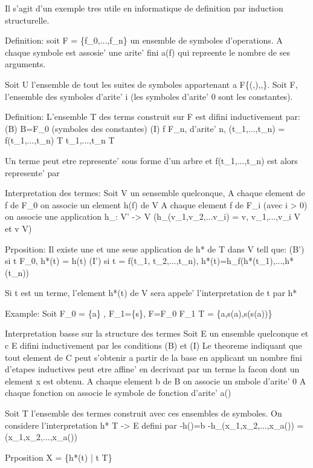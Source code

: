 \documentclass{article}
\begin{document}
Il s'agit d'un exemple tres utile en informatique de definition par induction structurelle.

Definition:
soit F = \{f_0,...,f_n\} un ensemble de symboles d'operations. A chaque symbole est assosie' une arite' fini a(f) \in \N qui repreente le nombre de ses arguments.

Soit U l'ensemble de tout les suites de symboles appartenant a F\cup \{(,),,\}.
Soit F, l'ensemble des symboles d'arite' i (les symboles d'arite' 0 sont les constantes).

Definition: L'ensemble T des terms construit sur F est difini inductivement par:
(B) B=F_0 (symboles des constantes)
(I) \forall f \in F_n, d'arite' n, \phi(t_1,...,t_n) = f(t_1,...,t_n) \in T
    \forall t_1,...,t_n \in T

Un terme peut etre represente' sous forme d'un arbre et f(t_1,...,t_n) est alors represente' par


Interpretation des termes:
Soit V  un sensemble quelconque, A chaque element de f de F_0 on associe un element h(f) de V
A chaque element f de F_i (avec i > 0) on associe une application h_\phi : V' -> V
(h_\phi(v_1,v_2,...v_i) = v, v_1,...,v_i \in V et v \in V)

Prposition: Il existe une et une seue application de h* de T dans V tell que:
(B') si t \in F_0, h*(t) = h(t)
(I') si t = f(t_1, t_2,...,t_n), h*(t)=h_f(h*(t_1),...,h*(t_n))

Si t est un terme, l'element h*(t) de V sera appele' l'interpretation de t par h*

Example: Soit F_0 = \{a\} , F_1=\{s\}, F=F_0 \cup F_1
T = \{a,s(a),s(s(a))\}

Interpretation basse sur la structure des termes
Soit E un ensemble quelconque et c \subseteq E difini inductivement par les conditions (B) et (I)
Le theoreme indiquant que tout element de C peut s'obtenir a partir de la base en applicant un nombre fini d'etapes inductives peut etre affine' en decrivant par un terme la facon dont un element x est obtenu.
A chaque element b de B on associe un smbole  d'arite' 0
A chaque fonction \phi on associe le symbole de fonction \overline{\phi} d'arite' a(\phi)

Soit T l'ensemble des termes construit avec ces ensembles de symboles. On considere l'interpretation h* T -> E defini par
-h()=b
-h_\phi (x_1,x_2,...,x_{a(\phi)}) = \phi(x_1,x_2,...,x_{a(\phi)})

Prposition X = \{h*(t) | t \in T\}
\end{document}
